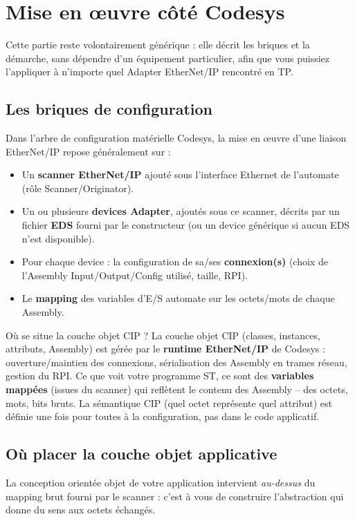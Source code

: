 \section{Mise en \oe uvre côté Codesys}
\label{sec:mise_en_oeuvre_codesys}

Cette partie reste volontairement générique : elle décrit les briques et la démarche, sans dépendre d'un équipement particulier, afin que vous puissiez l'appliquer à n'importe quel Adapter EtherNet/IP rencontré en TP.

\subsection{Les briques de configuration}
Dans l'arbre de configuration matérielle Codesys, la mise en \oe uvre d'une liaison EtherNet/IP repose généralement sur :

\begin{itemize}
    \item Un \textbf{scanner EtherNet/IP} ajouté sous l'interface Ethernet de l'automate (rôle Scanner/Originator).
    \item Un ou plusieurs \textbf{devices Adapter}, ajoutés sous ce scanner, décrits par un fichier \textbf{EDS} fourni par le constructeur (ou un device générique si aucun EDS n'est disponible).
    \item Pour chaque device : la configuration de sa/ses \textbf{connexion(s)} (choix de l'Assembly Input/Output/Config utilisé, taille, RPI).
    \item Le \textbf{mapping} des variables d'E/S automate sur les octets/mots de chaque Assembly.
\end{itemize}

\begin{UPSTIinfor}{Où se situe la couche objet CIP ?}
    La couche objet CIP (classes, instances, attributs, Assembly) est gérée par le \textbf{runtime EtherNet/IP} de Codesys : ouverture/maintien des connexions, sérialisation des Assembly en trames réseau, gestion du RPI. Ce que voit votre programme ST, ce sont des \textbf{variables mappées} (issues du scanner) qui reflètent le contenu des Assembly -- des octets, mots, bits bruts. La sémantique CIP (quel octet représente quel attribut) est définie une fois pour toutes à la configuration, pas dans le code applicatif.
\end{UPSTIinfor}

\subsection{Où placer la couche objet applicative}
La conception orientée objet de votre application intervient \emph{au-dessus} du mapping brut fourni par le scanner : c'est à vous de construire l'abstraction qui donne du sens aux octets échangés.

